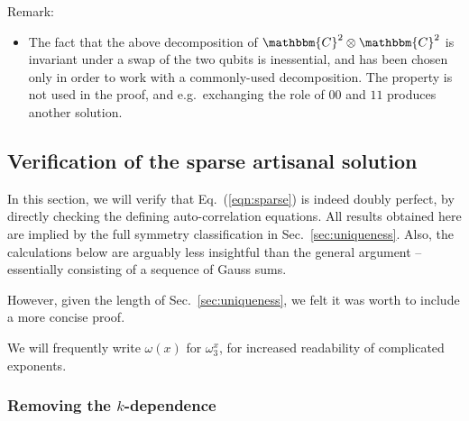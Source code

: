 \documentclass[aps,nofootinbib,floatfix,a4paper]{revtex4}
\newcommand{\1}{\mbox{$\mathbf{1}$}}
\def\CC{\mathbbm{C}}
\begin{document}
Remark:
\begin{itemize}
	\item
	The fact that the above decomposition of $\CC^2\otimes\CC^2$ is invariant under a swap of the two qubits is inessential, and has been chosen only in order to work with a commonly-used decomposition.
	The property is not used in the proof, and e.g.\ exchanging the role of $00$ and $11$ produces another solution.
\end{itemize}


\subsection{Verification of the sparse artisanal solution}
\label{sec:proof}

In this section, we will verify that Eq.~(\ref{eqn:sparse}) is indeed doubly perfect, by directly checking the defining auto-correlation equations.
All results obtained here are implied by the full symmetry classification in Sec.~\ref{sec:uniqueness}.
Also, the calculations below are arguably less insightful than the general argument -- essentially consisting of a sequence of Gauss sums.

However, given the length of Sec.~\ref{sec:uniqueness}, we felt it was worth to include a more concise proof.

We will frequently write $\omega(x)$ for $\omega_3^x$, for increased readability of complicated exponents.

\subsubsection{Removing the $k$-dependence}
\end{document}

